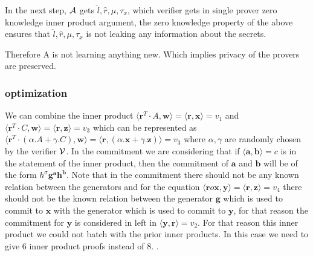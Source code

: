 In the next step, ${\cal A}$ gets $\hat{l}, \hat{r}, \mu, \tau_x$, which verifier gets in single prover zero knowledge inner product argument, the zero knowledge property of the above ensures that $\hat{l}, \hat{r}, \mu, \tau_x$ is not leaking any information about the secrets.

Therefore A is not learning anything new. Which implies privacy of the provers are preserved.

\subsubsection{optimization}
We can combine the inner product $\langle \bm{r}^T \cdot A, \bm{w}\rangle = \langle \bm{r}, \bm{x} \rangle =v_1$ and $\langle \bm{r}^T \cdot C, \bm{w}\rangle = \langle \bm{r}, \bm{z} \rangle =v_3$ which can be represented as $\langle \bm{r}^T \cdot(\alpha.A+\gamma.C), \bm{w}\rangle = \langle \bm{r}, (\alpha.\bm{x}+\gamma.\bm{z}) \rangle =v_3$ where $\alpha, \gamma$ are randomly chosen by the verifier ${\cal V}$. In the commitment we are considering that if $\langle \bm{a},\bm{b}\rangle= c$ is in the statement of the inner product, then the commitment of $\bm{a}$ and $\bm{b}$ will be of the form $h^{\sigma} \bm{g}^{\bm{a}} \bm{h}^{\bm{b}}$. Note that in the commitment there should not be any known relation between the generators and for the equation $\langle \bm{r} o \bm{x}, \bm{y} \rangle = \langle \bm{r}, \bm{z} \rangle =v_4$ there should not be the known relation between the generator $\bm{g}$ which is used to commit to $\bm{x}$ with the generator which is used to commit to $\bm{y}$, for that reason the commitment for $\bm{y}$ is considered in left in $\langle \bm{y}, \bm{r} \rangle = v_2$. For that reason this inner product we could not batch with the prior inner products. In this case we need to give 6 inner product proofs instead of 8. 
.
